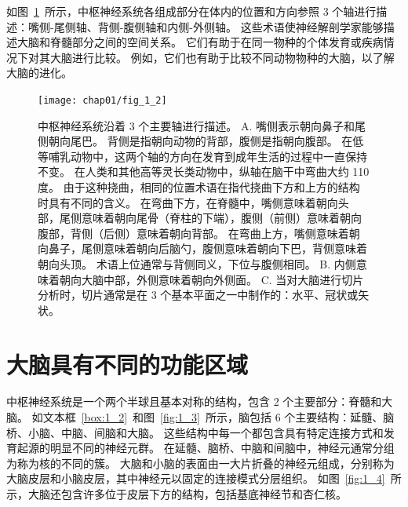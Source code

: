 \begin{proposition}[神经解剖学导航术语] \label{box:1_1}
	
	\quad \quad 如图~\ref{fig:1_2}~所示，中枢神经系统各组成部分在体内的位置和方向参照 3 个轴进行描述：嘴侧-尾侧轴、背侧-腹侧轴和内侧-外侧轴。
	这些术语使神经解剖学家能够描述大脑和脊髓部分之间的空间关系。
	它们有助于在同一物种的个体发育或疾病情况下对其大脑进行比较。
	例如，它们也有助于比较不同动物物种的大脑，以了解大脑的进化。

\end{proposition}


\begin{figure}[htbp]
	\centering
	\texttt{[image: chap01/fig\_1\_2]}
	\caption{中枢神经系统沿着 3 个主要轴进行描述\cite{martin2012neuroanatomy}。
		A. 嘴侧表示朝向鼻子和尾侧朝向尾巴。
		背侧是指朝向动物的背部，腹侧是指朝向腹部。
		在低等哺乳动物中，这两个轴的方向在发育到成年生活的过程中一直保持不变。
		在人类和其他高等灵长类动物中，纵轴在脑干中弯曲大约 110 度。
		由于这种挠曲，相同的位置术语在指代挠曲下方和上方的结构时具有不同的含义。
		在弯曲下方，在脊髓中，嘴侧意味着朝向头部，尾侧意味着朝向尾骨（脊柱的下端），腹侧（前侧）意味着朝向腹部，背侧（后侧）意味着朝向背部。
		在弯曲上方，嘴侧意味着朝向鼻子，尾侧意味着朝向后脑勺，腹侧意味着朝向下巴，背侧意味着朝向头顶。
		术语上位通常与背侧同义，下位与腹侧相同。
		B. 内侧意味着朝向大脑中部，外侧意味着朝向外侧面。
		C. 当对大脑进行切片分析时，切片通常是在 3 个基本平面之一中制作的：水平、冠状或矢状。}
	\label{fig:1_2}
\end{figure}



\section{大脑具有不同的功能区域}

中枢神经系统是一个两个半球且基本对称的结构，包含 2 个主要部分：脊髓和大脑。
如文本框~\ref{box:1_2}~和图~\ref{fig:1_3}~所示，脑包括 6 个主要结构：延髓、脑桥、小脑、中脑、间脑和大脑。
这些结构中每一个都包含具有特定连接方式和发育起源的明显不同的神经元群。
在延髓、脑桥、中脑和间脑中，神经元通常分组为称为核的不同的簇。
大脑和小脑的表面由一大片折叠的神经元组成，分别称为大脑皮层和小脑皮层，其中神经元以固定的连接模式分层组织。
如图~\ref{fig:1_4}~所示，大脑还包含许多位于皮层下方的结构，包括基底神经节和杏仁核。


